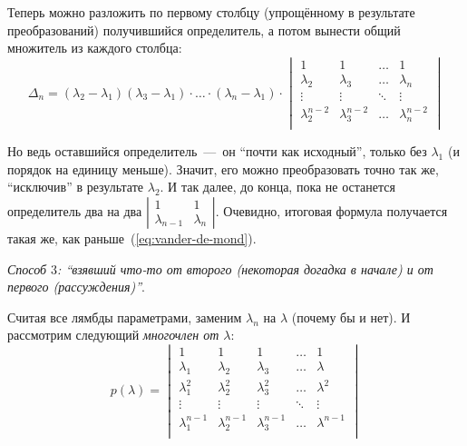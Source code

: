 \documentclass[a4paper,12pt]{article}
\theoremstyle{remark}
\begin{document}
\begin{solution}
    Теперь можно разложить по первому столбцу (упрощённому в результате преобразований) получившийся определитель, а потом вынести общий множитель из каждого столбца:
    \[
      \Delta_n = (\lambda_2 - \lambda_1) (\lambda_3 - \lambda_1) \cdot \ldots \cdot (\lambda_n - \lambda_1) \cdot \begin{vmatrix}
        1               & 1               & \ldots & 1\\
        \lambda_2       & \lambda_3       & \ldots & \lambda_n\\
        \vdots          & \vdots          & \ddots & \vdots\\
        \lambda_2^{n-2} & \lambda_3^{n-2} & \ldots & \lambda_n^{n-2}\\
      \end{vmatrix}
    \]
    
    Но ведь оставшийся определитель~---~он ``почти как исходный'', только без $\lambda_1$ (и порядок на единицу меньше).
    Значит, его можно преобразовать точно так же, ``исключив'' в результате $\lambda_2$.
    И так далее, до конца, пока не останется определитель два на два $\left|\begin{smallmatrix} 1 & 1 \\ \lambda_{n-1} & \lambda_n \end{smallmatrix}\right|$.
    Очевидно, итоговая формула получается такая же, как раньше~(\ref{eq:vander-de-mond}).
    
    \medskip
    
    \emph{Способ $3$: ``взявший что-то от второго (некоторая догадка в начале) и от первого (рассуждения)''}.
    
    Считая все лямбды параметрами, заменим $\lambda_n$ на $\lambda$ (почему бы и нет).
    И рассмотрим следующий \emph{многочлен от $\lambda$}:
    \[
      p(\lambda) = \begin{vmatrix}
        1               & 1               & 1               & \ldots & 1\\
        \lambda_1       & \lambda_2       & \lambda_3       & \ldots & \lambda\\
        \lambda_1^2     & \lambda_2^2     & \lambda_3^2     & \ldots & \lambda^2\\
        \vdots          & \vdots          & \vdots          & \ddots & \vdots\\
        \lambda_1^{n-1} & \lambda_2^{n-1} & \lambda_3^{n-1} & \ldots & \lambda^{n-1}\\
      \end{vmatrix}
    \]
    

\end{solution}
\end{document}
